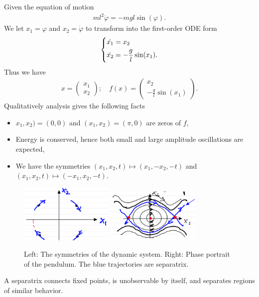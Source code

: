 \begin{ex}[Pendulum]
Given the equation of motion
\begin{align}
	ml^2 \ddot{\varphi} = -mgl \sin(\varphi).
\end{align}
We let $x_1 = \varphi$ and $x_2 =\dot{\varphi}$ to transform into the first-order ODE form
\begin{align}
	\begin{dcases}
		\dot{x_1} = x_2 \\
		\dot{x_2} = - \frac{g}{l} \sin (x_1).
	\end{dcases}
\end{align}
Thus we have 
\begin{align}
x = 
\begin{pmatrix}
	x_1 \\ x_2
\end{pmatrix}; \quad
f(x) = 
\begin{pmatrix}
	x_2 \\ - \frac{g}{l}\sin(x_1)	
\end{pmatrix}.
\end{align}
Qualitatively analysis gives the following facts
\begin{itemize}
	\item $x_1, x_2) = (0,0)$ and $(x_1, x_2) = (\pi , 0)$ are zeros of $f$,
	\item Energy is conserved, hence both small and large amplitude oscillations are expected,
	\item We have the symmetries $(x_1, x_2, t) \mapsto (x_1, -x_2, -t)$ and $(x_1, x_2, t) \mapsto (-x_1, x_2, -t)$.
\end{itemize}
\begin{figure}[h]
	\centering
	\includegraphics[width=0.4\textwidth]{figures/intro/6pendulum_symmetries.png}
	\hspace{0.05\textwidth}
	\includegraphics[width=0.4\textwidth]{figures/intro/5pendulum.png}
	\caption{Left: The symmetries of the dynamic system. Right: Phase portrait of the pendulum. The blue trajectories are separatrix.}
\end{figure}
\begin{definition}
	A separatrix connects fixed points, is unobservable by itself, and separates regions of similar behavior.
\end{definition}

\end{ex}

